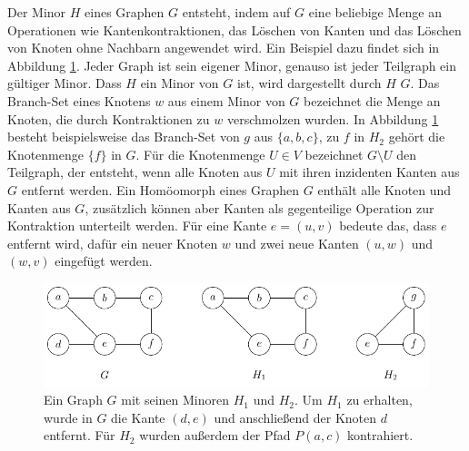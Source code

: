 Der Minor $H$ eines Graphen $G$ entsteht, indem auf $G$ eine beliebige Menge an Operationen wie Kantenkontraktionen, das Löschen von Kanten und das Löschen von Knoten ohne Nachbarn angewendet wird.
Ein Beispiel dazu findet sich in Abbildung \ref{fig:Minor}.
Jeder Graph ist sein eigener Minor, genauso ist jeder Teilgraph ein gültiger Minor.
Dass $H$ ein Minor von $G$ ist, wird dargestellt durch $H$ \minor $G$.
Das Branch-Set eines Knotens $w$ aus einem Minor von $G$ bezeichnet die Menge an Knoten, die durch Kontraktionen zu $w$ verschmolzen wurden.
In Abbildung \ref{fig:Minor} besteht beispielsweise das Branch-Set von $g$ aus $\{a, b, c\}$, zu $f$ in $H_2$ gehört die Knotenmenge $\{f\}$ in $G$.
Für die Knotenmenge $U \in V$ bezeichnet $G \setminus U$ den Teilgraph, der entsteht, wenn alle Knoten aus $U$ mit ihren inzidenten Kanten aus $G$ entfernt werden.
Ein Homöomorph eines Graphen $G$ enthält alle Knoten und Kanten aus $G$, zusätzlich können aber Kanten als gegenteilige Operation zur Kontraktion unterteilt werden.
Für eine Kante $e = (u, v)$ bedeute das, dass $e$ entfernt wird, dafür ein neuer Knoten $w$ und zwei neue Kanten $(u, w)$ und $(w, v)$ eingefügt werden.
\begin{figure}[H]
  \centering
  \includegraphics[keepaspectratio]{bilder/Minor.pdf}
  \caption{Ein Graph $G$ mit seinen Minoren $H_1$ und $H_2$.
           Um $H_1$ zu erhalten, wurde in $G$ die Kante $(d, e)$ und anschließend der Knoten $d$ entfernt.
           Für $H_2$ wurden außerdem der Pfad $P(a, c)$ kontrahiert.}
  \label{fig:Minor}
\end{figure}

